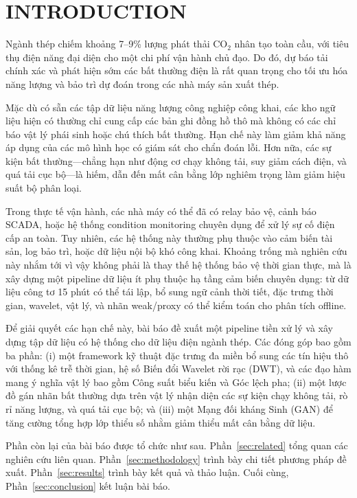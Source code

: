 \section{INTRODUCTION}
\label{sec:introduction}

Ngành thép chiếm khoảng 7--9\% lượng phát thải CO$_2$ nhân tạo toàn cầu, với tiêu thụ điện năng đại diện cho một chi phí vận hành chủ đạo. Do đó, dự báo tải chính xác và phát hiện sớm các bất thường điện là rất quan trọng cho tối ưu hóa năng lượng và bảo trì dự đoán trong các nhà máy sản xuất thép.

Mặc dù có sẵn các tập dữ liệu năng lượng công nghiệp công khai, các kho ngữ liệu hiện có thường chỉ cung cấp các bản ghi đồng hồ thô mà không có các chỉ báo vật lý phái sinh hoặc chú thích bất thường. Hạn chế này làm giảm khả năng áp dụng của các mô hình học có giám sát cho chẩn đoán lỗi. Hơn nữa, các sự kiện bất thường---chẳng hạn như động cơ chạy không tải, suy giảm cách điện, và quá tải cục bộ---là hiếm, dẫn đến mất cân bằng lớp nghiêm trọng làm giảm hiệu suất bộ phân loại.

Trong thực tế vận hành, các nhà máy có thể đã có relay bảo vệ, cảnh báo SCADA, hoặc hệ thống condition monitoring chuyên dụng để xử lý sự cố điện cấp an toàn. Tuy nhiên, các hệ thống này thường phụ thuộc vào cảm biến tài sản, log bảo trì, hoặc dữ liệu nội bộ khó công khai. Khoảng trống mà nghiên cứu này nhắm tới vì vậy không phải là thay thế hệ thống bảo vệ thời gian thực, mà là xây dựng một pipeline dữ liệu ít phụ thuộc hạ tầng cảm biến chuyên dụng: từ dữ liệu công tơ 15 phút có thể tái lập, bổ sung ngữ cảnh thời tiết, đặc trưng thời gian, wavelet, vật lý, và nhãn weak/proxy có thể kiểm toán cho phân tích offline.

Để giải quyết các hạn chế này, bài báo đề xuất một pipeline tiền xử lý và xây dựng tập dữ liệu có hệ thống cho dữ liệu điện ngành thép. Các đóng góp bao gồm ba phần: (i) một framework kỹ thuật đặc trưng đa miền bổ sung các tín hiệu thô với thống kê trễ thời gian, hệ số Biến đổi Wavelet rời rạc (DWT), và các đạo hàm mang ý nghĩa vật lý bao gồm Công suất biểu kiến và Góc lệch pha; (ii) một lược đồ gán nhãn bất thường dựa trên vật lý nhận diện các sự kiện chạy không tải, rò rỉ năng lượng, và quá tải cục bộ; và (iii) một Mạng đối kháng Sinh (GAN) để tăng cường tổng hợp lớp thiểu số nhằm giảm thiểu mất cân bằng dữ liệu.

Phần còn lại của bài báo được tổ chức như sau. Phần~\ref{sec:related} tổng quan các nghiên cứu liên quan. Phần~\ref{sec:methodology} trình bày chi tiết phương pháp đề xuất. Phần~\ref{sec:results} trình bày kết quả và thảo luận. Cuối cùng, Phần~\ref{sec:conclusion} kết luận bài báo.

